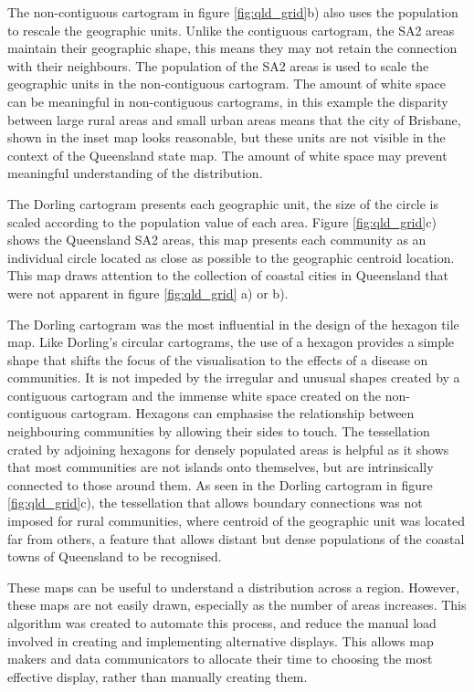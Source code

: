 \documentclass{monashthesis}
\begin{document}
The non-contiguous cartogram in figure \ref{fig:qld_grid}b) also uses the population to rescale the geographic units. Unlike the contiguous cartogram, the SA2 areas maintain their geographic shape, this means they may not retain the connection with their neighbours. The population of the SA2 areas is used to scale the geographic units in the non-contiguous cartogram. The amount of white space can be meaningful in non-contiguous cartograms, in this example the disparity between large rural areas and small urban areas means that the city of Brisbane, shown in the inset map looks reasonable, but these units are not visible in the context of the Queensland state map. The amount of white space may prevent meaningful understanding of the distribution.

The Dorling cartogram presents each geographic unit, the size of the circle is scaled according to the population value of each area. Figure \ref{fig:qld_grid}c) shows the Queensland SA2 areas, this map presents each community as an individual circle located as close as possible to the geographic centroid location. This map draws attention to the collection of coastal cities in Queensland that were not apparent in figure \ref{fig:qld_grid} a) or b).

The Dorling cartogram was the most influential in the design of the hexagon tile map.
Like Dorling's circular cartograms, the use of a hexagon provides a simple shape that shifts the focus of the visualisation to the effects of a disease on communities. It is not impeded by the irregular and unusual shapes created by a contiguous cartogram and the immense white space created on the non-contiguous cartogram.
Hexagons can emphasise the relationship between neighbouring communities by allowing their sides to touch. The tessellation crated by adjoining hexagons for densely populated areas is helpful as it shows that most communities are not islands onto themselves, but are intrinsically connected to those around them. As seen in the Dorling cartogram in figure \ref{fig:qld_grid}c), the tessellation that allows boundary connections was not imposed for rural communities, where centroid of the geographic unit was located far from others, a feature that allows distant but dense populations of the coastal towns of Queensland to be recognised.

These maps can be useful to understand a distribution across a region. However, these maps are not easily drawn, especially as the number of areas increases. This algorithm was created to automate this process, and reduce the manual load involved in creating and implementing alternative displays. This allows map makers and data communicators to allocate their time to choosing the most effective display, rather than manually creating them.
\end{document}
